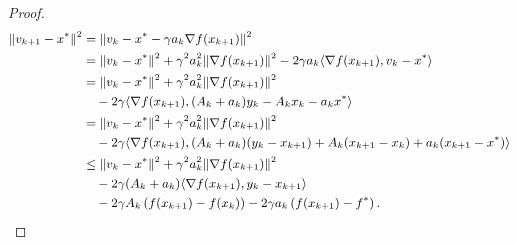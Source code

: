\documentclass{mcom-l}
\numberwithin{equation}{section}
\begin{document}
\begin{proof}
    \begin{equation*}
        \small
        \begin{aligned}
            \|v_{k+1} - x^*\|^2
             & = \|v_k - x^* - \gamma a_k \nabla f(x_{k+1})\|^2                                       \\
             & = \|v_k - x^*\|^2 + \gamma^2 a_k^2 \|\nabla f(x_{k+1})\|^2
            - 2\gamma a_k \langle \nabla f(x_{k+1}), v_k - x^* \rangle                                \\
             & = \|v_k - x^*\|^2 + \gamma^2 a_k^2 \|\nabla f(x_{k+1})\|^2                             \\
             & \quad - 2\gamma \langle \nabla f(x_{k+1}), (A_k + a_k) y_k - A_k x_k - a_k x^* \rangle \\
             & = \|v_k - x^*\|^2 + \gamma^2 a_k^2 \|\nabla f(x_{k+1})\|^2                             \\
             & \quad - 2\gamma \langle \nabla f(x_{k+1}),
            (A_k + a_k)(y_k - x_{k+1}) + A_k(x_{k+1} - x_k)
            + a_k(x_{k+1} - x^*) \rangle                                                              \\
             & \leq \|v_k - x^*\|^2 + \gamma^2 a_k^2 \|\nabla f(x_{k+1})\|^2                          \\
             & \quad - 2\gamma (A_k + a_k) \langle \nabla f(x_{k+1}), y_k - x_{k+1} \rangle           \\
             & \quad - 2\gamma A_k \left(f(x_{k+1}) - f(x_k)\right)
            - 2\gamma a_k \left(f(x_{k+1}) - f^*\right).
        \end{aligned}
    \end{equation*}


\end{proof}
\end{document}
